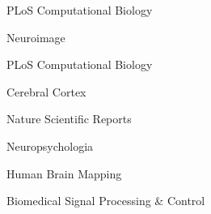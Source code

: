 
\fontsize{9pt}{1em}\bodyfontlight\upshape\color{text}

\begin{cvitems}
    \item {PLoS Computational Biology}
\end{cvitems}


\begin{cvitems}
    \item {Neuroimage}
    \item {PLoS Computational Biology}
    \item {Cerebral Cortex}
    \item {Nature Scientific Reports}
    \item {Neuropsychologia}
    \item {Human Brain Mapping}
    \item {Biomedical Signal Processing & Control}
\end{cvitems}

\vspace{2mm}